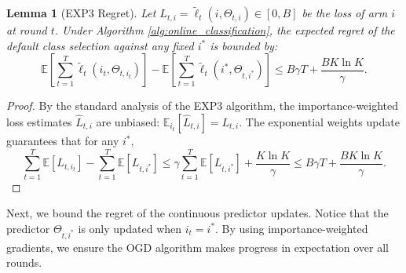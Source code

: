 \documentclass[11pt]{article}
\newtheorem{lemma}{Lemma}
\begin{document}
\begin{lemma}[EXP3 Regret]
\label{lem:exp3}
Let $L_{t,i} = \tilde{\ell}_t(i, \Theta_{t,i}) \in [0, B]$ be the loss of arm $i$ at round $t$. Under Algorithm \ref{alg:online_classification}, the expected regret of the default class selection against any fixed $i^*$ is bounded by:
\begin{equation}
    \mathbb{E}\left[ \sum_{t=1}^T \tilde{\ell}_t(i_t, \Theta_{t, i_t}) \right] - \mathbb{E}\left[ \sum_{t=1}^T \tilde{\ell}_t(i^*, \Theta_{t, i^*}) \right] \le B \gamma T + \frac{B K \ln K}{\gamma}.
\end{equation}
\end{lemma}
\begin{proof}
By the standard analysis of the EXP3 algorithm, the importance-weighted loss estimates $\hat{L}_{t,i}$ are unbiased: $\mathbb{E}_{i_t}[\hat{L}_{t,i}] = L_{t,i}$. The exponential weights update guarantees that for any $i^*$,
$$ \sum_{t=1}^T \mathbb{E}[L_{t,i_t}] - \sum_{t=1}^T \mathbb{E}[L_{t,i^*}] \le \gamma \sum_{t=1}^T \mathbb{E}[L_{t,i^*}] + \frac{K \ln K}{\gamma} \le B \gamma T + \frac{B K \ln K}{\gamma}. $$
\end{proof}

Next, we bound the regret of the continuous predictor updates. Notice that the predictor $\Theta_{t, i^*}$ is only updated when $i_t = i^*$. By using importance-weighted gradients, we ensure the OGD algorithm makes progress in expectation over all rounds.
\end{document}
